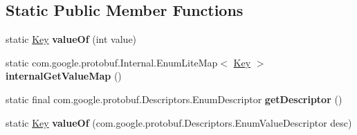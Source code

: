 \subsection*{Static Public Member Functions}
\begin{DoxyCompactItemize}
\item 
\mbox{\label{enumcom_1_1mysql_1_1cj_1_1x_1_1protobuf_1_1_mysqlx_expect_1_1_open_1_1_condition_1_1_key_a077b6dccafe1e79d2a697b692ea81e5b}} 
static \mbox{\hyperlink{enumcom_1_1mysql_1_1cj_1_1x_1_1protobuf_1_1_mysqlx_expect_1_1_open_1_1_condition_1_1_key}{Key}} {\bfseries value\+Of} (int value)
\item 
\mbox{\label{enumcom_1_1mysql_1_1cj_1_1x_1_1protobuf_1_1_mysqlx_expect_1_1_open_1_1_condition_1_1_key_a7baaf42be9b8b86f5b27d80a783be367}} 
static com.\+google.\+protobuf.\+Internal.\+Enum\+Lite\+Map$<$ \mbox{\hyperlink{enumcom_1_1mysql_1_1cj_1_1x_1_1protobuf_1_1_mysqlx_expect_1_1_open_1_1_condition_1_1_key}{Key}} $>$ {\bfseries internal\+Get\+Value\+Map} ()
\item 
\mbox{\label{enumcom_1_1mysql_1_1cj_1_1x_1_1protobuf_1_1_mysqlx_expect_1_1_open_1_1_condition_1_1_key_abeb7c87620f891c1ff72be98727123d1}} 
static final com.\+google.\+protobuf.\+Descriptors.\+Enum\+Descriptor {\bfseries get\+Descriptor} ()
\item 
\mbox{\label{enumcom_1_1mysql_1_1cj_1_1x_1_1protobuf_1_1_mysqlx_expect_1_1_open_1_1_condition_1_1_key_a1452c1e93f2700ef026aa4b00a519e54}} 
static \mbox{\hyperlink{enumcom_1_1mysql_1_1cj_1_1x_1_1protobuf_1_1_mysqlx_expect_1_1_open_1_1_condition_1_1_key}{Key}} {\bfseries value\+Of} (com.\+google.\+protobuf.\+Descriptors.\+Enum\+Value\+Descriptor desc)
\end{DoxyCompactItemize}
